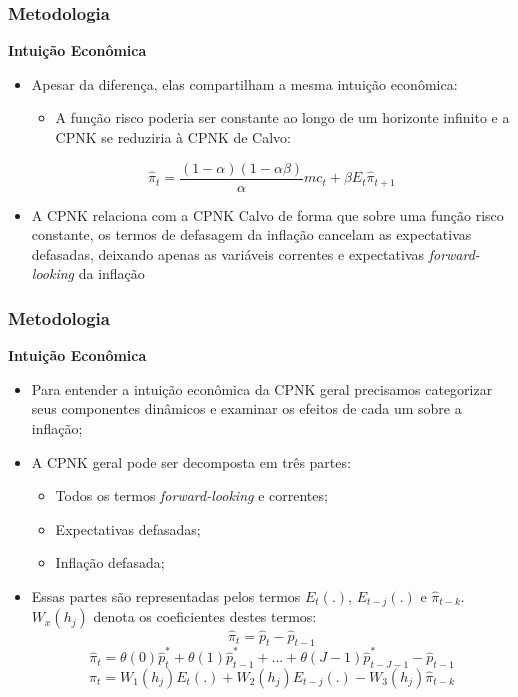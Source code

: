 \documentclass[aspectratio=169]{beamer}
\begin{document}
\begin{frame}\frametitle{Metodologia}
  \textbf{Intuição Econômica}
  \begin{itemize}
  \item Apesar da diferença, elas compartilham a mesma intuição econômica:
    \begin{itemize}
    \item A função risco poderia ser constante ao longo de um horizonte infinito e a CPNK se reduziria à CPNK de Calvo:
    \end{itemize}
    \begin{exampleblock}{}
  \[
{ \hat { \pi  }  }_{ t }=\frac { \left( 1-\alpha  \right) \left( 1-\alpha \beta  \right)  }{ \alpha  } { mc }_{ t }+\beta { E }_{ t }{ \hat { \pi  }  }_{ t+1 }
  \]
  \end{exampleblock}
  \item A CPNK relaciona com a CPNK Calvo de forma que sobre uma função risco constante, os termos de defasagem da inflação cancelam as expectativas defasadas, deixando apenas as variáveis correntes e expectativas \emph{forward-looking} da inflação
  \end{itemize}
\end{frame}

\begin{frame}\frametitle{Metodologia}
  \textbf{Intuição Econômica}
  \begin{itemize}
  \item Para entender a intuição econômica da CPNK geral precisamos categorizar seus componentes dinâmicos e examinar os efeitos de cada um sobre a inflação;
  \item A CPNK geral pode ser decomposta em três partes:
    \begin{itemize}
    \item Todos os termos \emph{forward-looking} e correntes;
    \item Expectativas defasadas;
    \item Inflação defasada;
    \end{itemize}
  \item Essas partes são representadas pelos termos ${E}_{t}(.)$, ${E}_{t-j}(.)$ e $\hat{\pi}_{t-k}$. $W_{x}(h_{j})$ denota os coeficientes destes termos:
    \begin{equation}
{ \hat { \pi  }  }_{ t }={ \hat { p }  }_{ t }-{ \hat { p }  }_{ t-1 }
    \end{equation}
    \begin{equation}
{ \hat { \pi  }  }_{ t }=\theta \left( 0 \right) { \hat { p }  }_{ t }^{ * }+\theta \left( 1 \right) { \hat { p }  }_{ t-1 }^{ * }+...+\theta \left( J-1 \right) { \hat { p }  }_{ t-J-1 }^{ * }-{ \hat { p }  }_{ t-1 }
    \end{equation}
    \begin{equation}
{ \hat { \pi  }  }_{ t }={ W }_{ 1 }\left( { h }_{ j } \right) { E }_{ t }\left( . \right) +{ W }_{ 2 }\left( { h }_{ j } \right) { E }_{ t-j }\left( . \right) -{ W }_{ 3 }\left( { h }_{ j } \right) { \hat { \pi  }  }_{ t-k }
    \end{equation}
  \end{itemize}
\end{frame}
\end{document}
